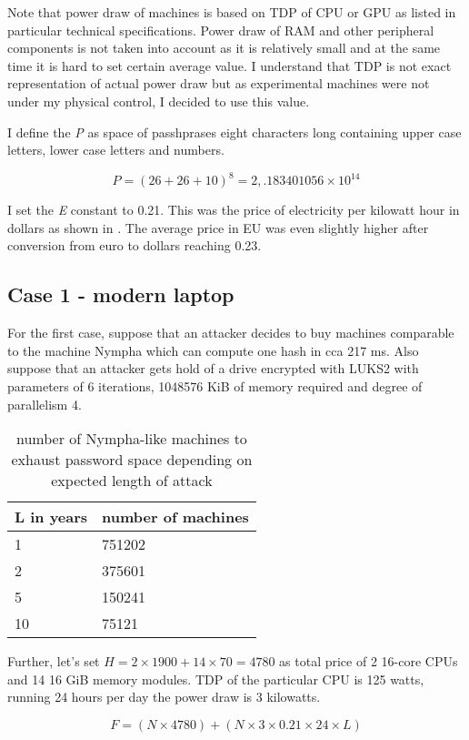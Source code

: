 \documentclass[nolof]{fithesis3}
\begin{document}
Note that power draw of machines is based on TDP of CPU or GPU as listed in particular technical specifications. Power draw of RAM and other peripheral components is not taken into account as it is relatively small and at the same time it is hard to set certain average value. I understand that TDP is not exact representation of actual power draw but as experimental machines were not under my physical control, I decided to use this value.

I define the \emph{P} as space of passhprases eight characters long containing upper case letters, lower case letters and numbers.

$$P = (26 + 26 + 10)^8 = 2,.183401056 \times 10^{14}$$

I set the \emph{E} constant to 0.21. This was the price of electricity per kilowatt hour in dollars as shown in \parencite{electricity}. The average price in EU was even slightly higher after conversion from euro to dollars reaching 0.23.

\subsection{Case 1 - modern laptop}
\FloatBarrier
For the first case, suppose that an attacker decides to buy machines comparable to the machine Nympha which can compute one hash in cca 217 ms. Also suppose that an attacker gets hold of a drive encrypted with LUKS2 with parameters of 6 iterations, 1048576 KiB of memory required and degree of parallelism 4.

\noindent
\begin{table}
\caption{number of Nympha-like machines to exhaust password space depending on expected length of attack}
\label{tab:at1}
\begin{tabularx}{\textwidth}{| X | X |}
\hline
L in years & number of machines\\
\hline
1 & 751202\\
\hline
2 & 375601\\
\hline
5 & 150241\\
\hline
10 & 75121\\
\hline
\end{tabularx}
\end{table}

Further, let's set $H = 2 \times 1900 + 14 \times 70 = 4780$ as total price of 2 16-core CPUs and 14 16 GiB memory modules. TDP of the particular CPU is 125 watts, running 24 hours per day the power draw is 3 kilowatts.

$$F = ( N \times 4780 ) + ( N \times 3 \times 0.21 \times 24 \times L)$$
\end{document}
